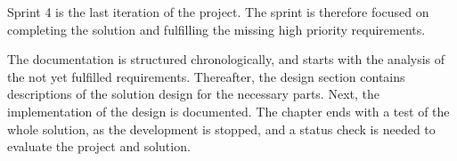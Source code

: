 Sprint 4 is the last iteration of the project.
The sprint is therefore focused on completing the solution and fulfilling the missing high priority requirements.

The documentation is structured chronologically, and starts with the analysis of the not yet fulfilled requirements.
Thereafter, the design section contains descriptions of the solution design for the necessary parts.
Next, the implementation of the design is documented.
The chapter ends with a test of the whole solution, as the development is stopped, and a status check is needed to evaluate the project and solution.
